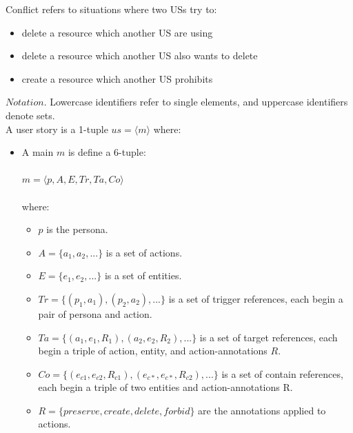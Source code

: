 \begin{definition}
	Conflict refers to situations where two USs try to:	 
	\begin{itemize}
		\item delete a resource which another US are using
		\item delete a resource which another US also wants to delete
		\item create a resource which another US prohibits
	\end{itemize}
	$Notation$. Lowercase identifiers refer to single elements, and uppercase identifiers denote sets. 
	\\A user story is a 1-tuple $us = \langle m\rangle $ where:
	\begin{itemize}
		\item A main $m$ is define a 6-tuple: \\\\$m = \langle p,A,E,Tr,Ta,Co\rangle $ \\\\where:
		
	\begin{itemize}
		\item $p$ is the persona.
		
		\item $A = \{ a_1,a_2,...\} $ is a set of actions.
		
		\item $E = \{e_1,e_2,...\}$ is a set of entities.
		
		\item $Tr = \{(p_1,a_1),(p_2,a_2),...\}$ is a set of trigger references, each begin a pair of persona and action.
		
		\item $Ta = \{(a_1,e_1,R_1),(a_2,e_2,R_2),...\}$ is a set of target references, each begin a triple of action, entity, and action-annotations $R$.
		
		\item $Co = \{ (e_{c1},e_{c2},R_{c1}),(e_{c*},e_{c*},R_{c2}),... \}$ is a set of contain references, each begin a triple of two entities and action-annotations R.
		
		\item $R = \{preserve, create, delete, forbid\}$ are the annotations applied to actions.
	\end{itemize}
	

\end{itemize}
\end{definition}
